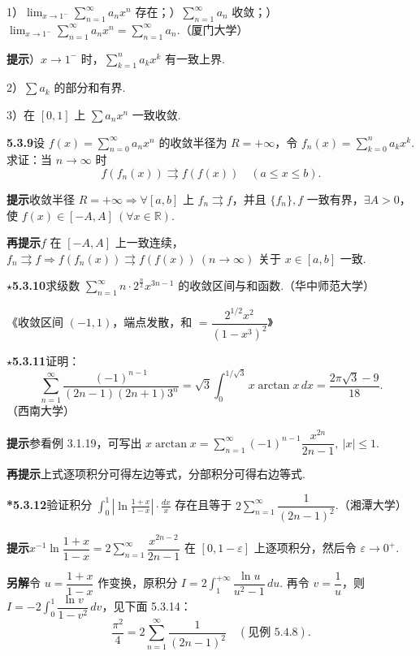 \documentclass[UTF8,12pt,a4paper,fontset=fandol]{ctexart}
\begin{document}
1）$\displaystyle\lim_{x\to1^-}\sum_{n=1}^{\infty}a_nx^n$ 存在；）$\displaystyle\sum_{n=1}^{\infty}a_n$ 收敛；）$\displaystyle\lim_{x\to1^-}\sum_{n=1}^{\infty}a_nx^n=\sum_{n=1}^{\infty}a_n$.（厦门大学）

\noindent\textbf{提示}）$x\to1^-$ 时，$\displaystyle\sum_{k=1}^n a_kx^k$ 有一致上界.

2）$\displaystyle\sum a_k$ 的部分和有界.

3）在 $[0,1]$ 上 $\displaystyle\sum a_nx^n$ 一致收敛.

\noindent\textbf{5.3.9}\quad 设 $f(x)=\displaystyle\sum_{n=0}^{\infty}a_nx^n$ 的收敛半径为 $R=+\infty$，令 $f_n(x)=\displaystyle\sum_{k=0}^n a_kx^k$. 求证：当 $n\to\infty$ 时
\[
  f(f_n(x))\rightrightarrows f(f(x))\quad(a\le x\le b).
\]

\noindent\textbf{提示}\quad 收敛半径 $R=+\infty\Rightarrow\forall[a,b]$ 上 $f_n\rightrightarrows f$，并且 $\{f_n\},f$ 一致有界，$\exists A>0$，使 $f(x)\in[-A,A]\ (\forall x\in\mathbb R)$.

\noindent\textbf{再提示}\quad $f$ 在 $[-A,A]$ 上一致连续，$f_n\rightrightarrows f\Longrightarrow f(f_n(x))\rightrightarrows f(f(x))\ (n\to\infty)$ 关于 $x\in[a,b]$ 一致.

\noindent\textbf{\(\star\)5.3.10}\quad 求级数 $\displaystyle\sum_{n=1}^{\infty}n\cdot2^{\frac n2}x^{3n-1}$ 的收敛区间与和函数.（华中师范大学）

\hfill 《收敛区间 $(-1,1)$，端点发散，和 $=\dfrac{2^{1/2}x^2}{(1-x^3)^2}$》

\noindent\textbf{\(\star\)5.3.11}\quad 证明：
\[
  \sum_{n=1}^{\infty}\frac{(-1)^{n-1}}{(2n-1)(2n+1)3^n}
  =\sqrt3\int_0^{1/\sqrt3}x\arctan x\,dx
  =\frac{2\pi\sqrt3-9}{18}.
\]
（西南大学）

\noindent\textbf{提示}\quad 参看例 3.1.19，可写出 $x\arctan x=\displaystyle\sum_{n=1}^{\infty}(-1)^{n-1}\dfrac{x^{2n}}{2n-1},\ |x|\le1$.

\noindent\textbf{再提示}\quad 上式逐项积分可得左边等式，分部积分可得右边等式.

\noindent\textbf{*5.3.12}\quad 验证积分 $\displaystyle\int_0^1\left|\ln\frac{1+x}{1-x}\right|\cdot\frac{dx}{x}$ 存在且等于 $2\displaystyle\sum_{n=1}^{\infty}\dfrac1{(2n-1)^2}$.（湘潭大学）

\noindent\textbf{提示}\quad $x^{-1}\ln\dfrac{1+x}{1-x}=2\displaystyle\sum_{n=1}^{\infty}\dfrac{x^{2n-2}}{2n-1}$ 在 $[0,1-\varepsilon]$ 上逐项积分，然后令 $\varepsilon\to0^+$.

\noindent\textbf{另解}\quad 令 $u=\dfrac{1+x}{1-x}$ 作变换，原积分 $I=2\displaystyle\int_1^{+\infty}\dfrac{\ln u}{u^2-1}\,du$. 再令 $v=\dfrac1u$，则 $I=-2\displaystyle\int_0^1\dfrac{\ln v}{1-v^2}\,dv$，见下面 5.3.14：
\[
  \frac{\pi^2}{4}=2\sum_{n=1}^{\infty}\frac1{(2n-1)^2}\quad(\text{见例 5.4.8}).
\]
\end{document}
